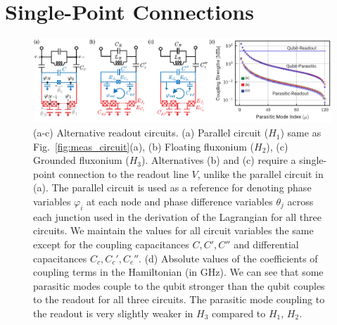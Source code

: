 \documentclass[%
reprint,
superscriptaddress,
 amsmath,amssymb,
 aps,
 prx,
longbibliography,
floatfix,
]{revtex4-2}
\begin{document}
\section{Single-Point Connections}\label{app:alt_circuits}
\begin{figure}[htb]
    \centering
    \includegraphics[width=\linewidth]{Supp_Fig/Circuit_choice.pdf}
    \caption{(a-c) Alternative readout circuits. (a) Parallel circuit ($H_1$) same as Fig.~\ref{fig:meas_circuit}(a), (b) Floating fluxonium ($H_2$), (c) Grounded fluxonium ($H_3$). Alternatives (b) and (c) require a single-point connection to the readout line $V$, unlike the parallel circuit in (a). The parallel circuit is used as a reference for denoting phase variables $\varphi_i$ at each node and phase difference variables $\theta_j$ across each junction used in the derivation of the Lagrangian for all three circuits. We maintain the values for all circuit variables the same except for the coupling capacitances $C,C',C''$ and differential capacitances $C_c,C_c',C_c''$. (d) Absolute values of the coefficients of coupling terms in the Hamiltonian (in GHz). We can see that some parasitic modes couple to the qubit stronger than the qubit couples to the readout for all three circuits. The parasitic mode coupling to the readout is very slightly weaker in $H_3$ compared to $H_1$, $H_2$.}
    \label{fig:circuit_choice}
\end{figure}
\end{document}
